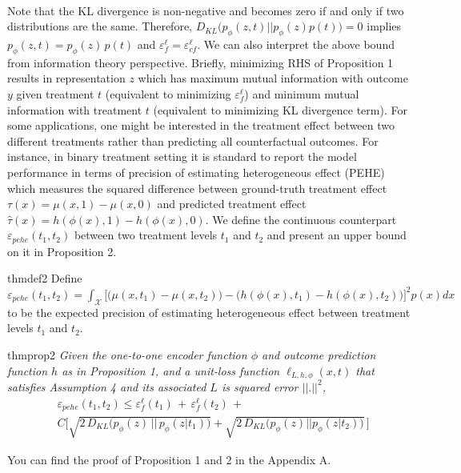 \documentclass[letterpaper]{article} %
\begin{document}
\\
Note that the KL divergence is non-negative and becomes zero if and only if two distributions are the same. Therefore, $D_{KL}\bigg(p_{\phi}(z, t) || p_{\phi}(z)p(t)\bigg) = 0$ implies $p_{\phi}(z, t)  = p_{\phi}(z)\,p(t)$ and $\varepsilon_f^\ell = \varepsilon_{cf}^\ell$.
We can also interpret the above bound from information theory perspective. Briefly, minimizing RHS of Proposition 1 results in representation $z$ which has maximum mutual information with outcome $y$ given treatment $t$ (equivalent to minimizing $\varepsilon_f^\ell$) and minimum mutual information with treatment $t$ (equivalent to minimizing KL divergence term).
\newline
\newline
For some applications, one might be interested in the treatment effect between two different treatments rather than predicting all counterfactual outcomes. For instance, in binary treatment setting it is standard to report the model performance in terms of precision of estimating heterogeneous effect (PEHE) \cite{Hill2011BayesianNM} which measures the squared difference between ground-truth treatment effect $\tau(x) = \mu(x, 1) - \mu(x, 0)$ and predicted treatment effect $\hat{\tau}(x) = h(\phi(x), 1) - h(\phi(x), 0)$. We define the continuous counterpart $\varepsilon_{pehe}(t_1, t_2)$ between two treatment levels $t_1$ and $t_2$ and present an upper bound on it in Proposition 2.
\newline
\newline
\begin{restatable*}{thm}{def2} 
Define $\varepsilon_{pehe}(t_1, t_2) = \int_{\mathcal{X}} \big[ \big( \mu(x, t_1) - \mu(x, t_2) \big) - \big( h(\phi(x), t_1) - h(\phi(x), t_2) \big) \big]^2 p(x)dx$ to be the expected precision of estimating heterogeneous effect between treatment levels $t_1$ and $t_2$.
\end{restatable*}
\newline
\newline
\begin{restatable*}{thm}{prop2}
\textit{Given the one-to-one encoder function $\phi$ and outcome prediction function $h$ as in Proposition 1, and a unit-loss function $\ell_{L, h, \phi}(x, t)$ that satisfies Assumption 4 and its associated $L$ is squared error $||.||^2$,
\small
\begin{align*}
   &\varepsilon_{pehe}(t_1, t_2) \le \varepsilon_f^{\ell}(t_1) \, + \, 
\varepsilon_f^{\ell}(t_2) \,  + \, \\
& C \Bigg[\sqrt{2\, D_{KL}\bigg(p_{\phi}(z) \, \big|\big| \, p_{\phi}(z|t_1)\bigg)} +
\sqrt{2\, D_{KL}\bigg(p_{\phi}(z) || p_{\phi}(z|t_2)\bigg)} \, \Bigg]
\end{align*}
}
\end{restatable*}
You can find the proof of Proposition 1 and 2 in the Appendix A.
\end{document}
